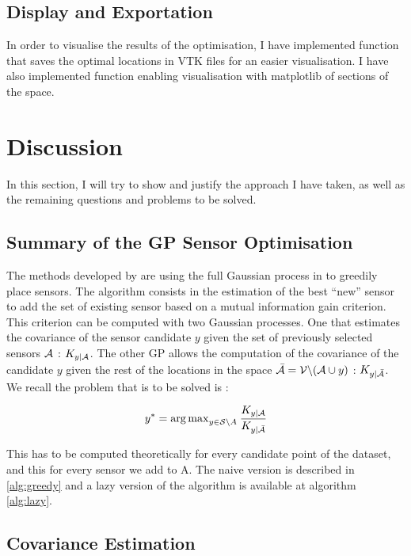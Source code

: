 \subsection{Display and Exportation}

In order to visualise the results of the optimisation, I have implemented function that saves the optimal locations in VTK files for an easier visualisation. I have also implemented function enabling visualisation with matplotlib of sections of the space. 

\section{Discussion}

In this section, I will try to show and justify the approach I have taken, as well as the remaining questions and problems to be solved. 

\subsection{Summary of the GP Sensor Optimisation}

The methods developed by \citet{krause_near-optimal_2008} are using the full Gaussian process in to greedily place sensors. The algorithm consists in the estimation of the best “new” sensor to add the set of existing sensor based on a mutual information gain criterion. This criterion can be computed with two Gaussian processes. One that estimates the covariance of the sensor candidate $y$ given the set of previously selected sensors $\mathcal{A}$ : $K_{y | \mathcal{A}}$. The other GP allows the computation of the covariance of the candidate $y$ given the rest of the locations in the space $\bar{\mathcal{A}} = \mathcal{V} \backslash ( \mathcal{A} \cup y )$ : $K_{y | \bar{\mathcal{A}}}$. We recall the problem that is to be solved is :

\begin{equation}
    y^* = {\arg \max}_{y \in \mathcal{S} \backslash A } \: \frac{K_{y | \mathcal{A}}}{K_{y | \bar{\mathcal{A}}}}
\end{equation}

This has to be computed theoretically for every candidate point of the dataset, and this for every sensor we add to A. The naive version is described in \ref{alg:greedy} and a lazy version of the algorithm is available at algorithm \ref{alg:lazy}.

\subsection{Covariance Estimation}

